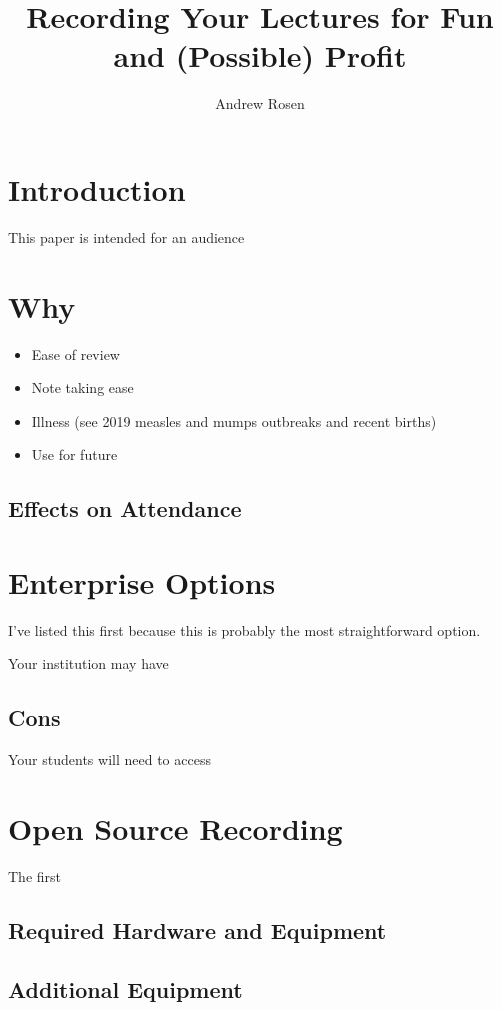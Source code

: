 \documentclass[sigconf]{acmart}
\title{Recording Your Lectures for Fun and (Possible) Profit}
\author{Andrew Rosen}
\affiliation{\institution{Temple University}}
\begin{document}
\maketitle



\section{Introduction}

This paper is intended for an audience 
\section{Why}


\begin{itemize}
	\item Ease of review
	\item Note taking ease
	\item Illness (see 2019  measles and mumps outbreaks and recent births)
	\item Use for future 
\end{itemize}

\subsection{Effects on Attendance}


\section{Enterprise Options}
I've listed this first because this is probably the most straightforward option.

Your institution may have 


\subsection{Cons}
Your students will need to access

\section{Open Source Recording}
The first 




\subsection{Required Hardware and Equipment}


\subsection{Additional Equipment}
\end{document}
